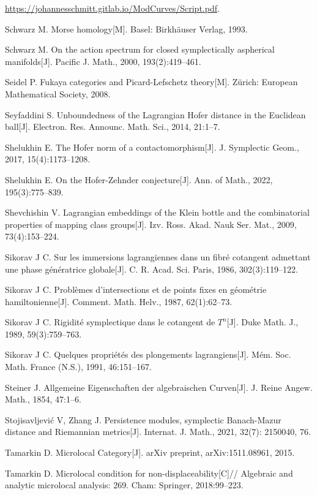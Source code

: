 \begin{enumerate}[label={[\arabic*]},leftmargin=3.2em,itemsep=2pt,parsep=0pt]
        \url{https://johannesschmitt.gitlab.io/ModCurves/Script.pdf}.
  \item Schwarz M. Morse homology[M]. Basel: Birkhäuser Verlag, 1993.
  \item Schwarz M. On the action spectrum for closed symplectically aspherical manifolds[J].
        Pacific J. Math., 2000, 193(2):419--461.
  \item Seidel P. Fukaya categories and Picard-Lefschetz theory[M]. Zürich: European
        Mathematical Society, 2008.
  \item Seyfaddini S. Unboundedness of the Lagrangian Hofer distance in the Euclidean
        ball[J]. Electron. Res. Announc. Math. Sci., 2014, 21:1--7.
  \item Shelukhin E. The Hofer norm of a contactomorphism[J]. J. Symplectic Geom., 2017,
        15(4):1173--1208.
  \item Shelukhin E. On the Hofer-Zehnder conjecture[J]. Ann. of Math., 2022, 195(3):775--839.
  \item Shevchishin V. Lagrangian embeddings of the Klein bottle and the combinatorial
        properties of mapping class groups[J]. Izv. Ross. Akad. Nauk Ser. Mat., 2009,
        73(4):153--224.
  \item Sikorav J C. Sur les immersions lagrangiennes dans un fibré cotangent admettant une
        phase génératrice globale[J]. C. R. Acad. Sci. Paris, 1986, 302(3):119--122.
  \item Sikorav J C. Problèmes d'intersections et de points fixes en géométrie
        hamiltonienne[J]. Comment. Math. Helv., 1987, 62(1):62--73.
  \item Sikorav J C. Rigidité symplectique dans le cotangent de $T^n$[J]. Duke Math. J.,
        1989, 59(3):759--763.
  \item Sikorav J C. Quelques propriétés des plongements lagrangiens[J]. Mém. Soc. Math.
        France (N.S.), 1991, 46:151--167.
  \item Steiner J. Allgemeine Eigenschaften der algebraischen Curven[J]. J. Reine Angew.
        Math., 1854, 47:1--6.
  \item Stojisavljević V, Zhang J. Persistence modules, symplectic Banach-Mazur distance and
        Riemannian metrics[J]. Internat. J. Math., 2021, 32(7): 2150040, 76.
  \item Tamarkin D. Microlocal Category[J]. arXiv preprint, arXiv:1511.08961, 2015.
  \item Tamarkin D. Microlocal condition for non-displaceability[C]// Algebraic and
        analytic microlocal analysis: 269. Cham: Springer, 2018:99--223.

\end{enumerate}
